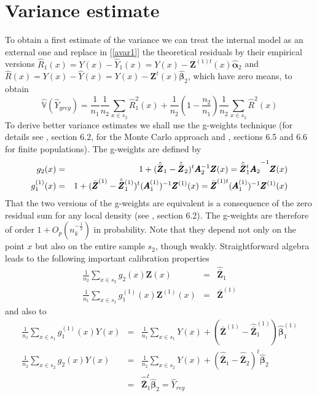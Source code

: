 \documentclass[a4paper,12pt,leqno, titlepage]{article}
\newcommand{\VAR}{\mathbb{V}}
\begin{document}
\section{Variance estimate}
To obtain a first estimate of the variance we can treat the internal model as an external one and replace in [\ref{avar1}] the theoretical residuals by their empirical versions $\hat{R}_1(x)=Y(x)-\hat{Y}_1(x)=Y(x)-\pmb{Z}^{(1)t}(x)\hat{\pmb{\alpha}}_2$ and $\hat{R}(x)=Y(x)-\hat{Y}(x)=Y(x)-\pmb{Z}^t(x)\hat{\pmb{\beta}}_2$, which have zero means, to obtain
\begin{equation}\label{estavar1}
\hat{\VAR}(\hat{Y}_{greg})=\frac{1}{n_1}\frac{1}{n_2}\sum_{x\in{s}_2}\hat{R}_1^2(x)+
\frac{1}{n_2}(1-\frac{n_2}{n_1})\frac{1}{n_2}\sum_{x\in{s}_2}\hat{R}^2(x)
\end{equation}
To derive better variance estimates we shall use the g-weights technique (for details see \cite{mandallaz}, section 6.2, for the Monte Carlo approach and \cite{sarndal}, sections 6.5 and 6.6 for finite populations). The g-weights are defined by
\begin{eqnarray}\label{gweight1}
g_2(x) &=& 1+(\hat{\bar{\pmb{Z}}}_1-\hat{\bar{\pmb{Z}}}_2)^t\pmb{A}_2 ^{-1}\pmb{Z}(x)  =\hat{\bar{\pmb{Z}}}_1^t\pmb{A}_2}^{-1}{\pmb{Z}(x)\nonumber \\
g^{(1)}_1(x) &=& 1+(\bar{\pmb{Z}}^{(1)}-\hat{\bar{\pmb{Z}}}^{(1)}_1)^t(\pmb{A}^{(1)}_1)^{-1}\pmb{Z}^{(1)}(x) =\bar{\pmb{Z}}^{(1)t}(\pmb{A}^{(1)}_1)^{-1}\pmb{Z}^{(1)}(x)
\end{eqnarray}
That the two versions of the g-weights are equivalent is a consequence of the zero residual sum for any local density (see \cite{mandallaz}, section 6.2). The g-weights are therefore of order $1+O_p(n_k^{-\frac{1}{2}})$ in probability. Note that they depend not only on the point $x$ but also on the entire sample $s_2$, though weakly. Straightforward algebra leads to the following important calibration properties
\begin{eqnarray}\label{gweight2}
\frac{1}{n_2}\sum_{x\in{s}_2}g_2(x)\pmb{Z}(x)&=&\hat{\bar{\pmb{Z}}}_1 \nonumber \\
\frac{1}{n_1}\sum_{x\in{s}_1}g^{(1)}_1(x)\pmb{Z}^{(1)}(x)&=&\bar{\pmb{Z}}^{(1)}
\end{eqnarray}
and also to
\begin{eqnarray}\label{gweight3}
\frac{1}{n_1}\sum_{x\in{s}_1}g_1^{(1)}(x)Y(x)&=&\frac{1}{n_1}\sum_{x\in{s_1}}Y(x) +
(\bar{\pmb{Z}}^{(1)}-\hat{\bar{\pmb{Z}}}^{(1)}_1)\hat{\pmb{\beta}}^{(1)}_1 \nonumber \\
\frac{1}{n_2}\sum_{x\in{s}_2}g_2(x)Y(x)&=&\frac{1}{n_2}\sum_{x\in{s}_2}Y(x) +
(\hat{\bar{\pmb{Z}}}_1-\hat{\bar{\pmb{Z}}}_2)^t\hat{\pmb{\beta}}_2 \nonumber \\
&=& \hat{\bar{\pmb{Z}}}_1^t\hat{\pmb{\beta}}_2=\hat{Y}_{reg}
\end{eqnarray}
\end{document}
